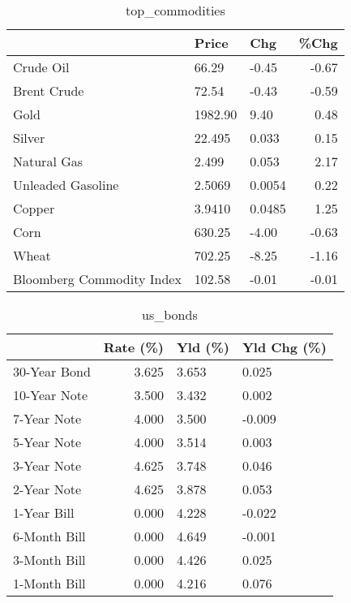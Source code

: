 \documentclass{article}%
\begin{document}
\begin{table}[htbp]%
\caption{top\_commodities}%
\centering%
\begin{adjustbox}{width=1\textwidth}%
\begin{tabular}{lllr}
\toprule
                          &   Price &    Chg &  \%Chg \\
\midrule
               Crude Oil  &   66.29 &  -0.45 & -0.67 \\
             Brent Crude  &   72.54 &  -0.43 & -0.59 \\
                    Gold  & 1982.90 &   9.40 &  0.48 \\
                  Silver  &  22.495 &  0.033 &  0.15 \\
             Natural Gas  &   2.499 &  0.053 &  2.17 \\
       Unleaded Gasoline  &  2.5069 & 0.0054 &  0.22 \\
                  Copper  &  3.9410 & 0.0485 &  1.25 \\
                    Corn  &  630.25 &  -4.00 & -0.63 \\
                   Wheat  &  702.25 &  -8.25 & -1.16 \\
Bloomberg Commodity Index &  102.58 &  -0.01 & -0.01 \\
\bottomrule
\end{tabular}
%
\end{adjustbox}%
\end{table}

%


\begin{table}[htbp]%
\caption{us\_bonds}%
\centering%
\begin{adjustbox}{width=1\textwidth}%
\begin{tabular}{lrll}
\toprule
             &  Rate (\%) & Yld (\%) & Yld Chg (\%) \\
\midrule
30-Year Bond &     3.625 &   3.653 &       0.025 \\
10-Year Note &     3.500 &   3.432 &       0.002 \\
 7-Year Note &     4.000 &   3.500 &      -0.009 \\
 5-Year Note &     4.000 &   3.514 &       0.003 \\
 3-Year Note &     4.625 &   3.748 &       0.046 \\
 2-Year Note &     4.625 &   3.878 &       0.053 \\
 1-Year Bill &     0.000 &   4.228 &      -0.022 \\
6-Month Bill &     0.000 &   4.649 &      -0.001 \\
3-Month Bill &     0.000 &   4.426 &       0.025 \\
1-Month Bill &     0.000 &   4.216 &       0.076 \\
\bottomrule
\end{tabular}
%
\end{adjustbox}%
\end{table}
\end{document}
